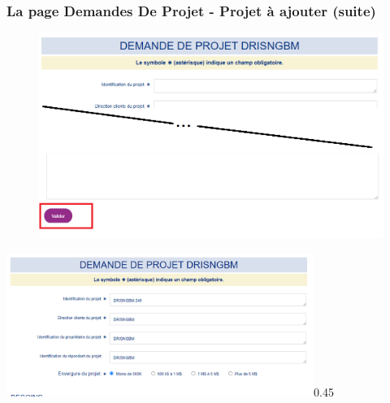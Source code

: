 \documentclass[aspectratio=169]{beamer}%
\let\note\relax
\begin{document}
\begin{frame}
\transwipe 
\label{pictures}
\frametitle{La page Demandes De Projet - Projet à ajouter (suite)}

\begin{figure}
\includegraphics[scale=0.33]{form_valider}
\end{figure}
\end{frame}
\begin{frame}
\transwipe 
  \centering
    \begin{annotate}{\includegraphics[width=0.75\textwidth]{Projet_a_soumettre}}{0.45}
        
    \end{annotate}
    
    \end{frame}
    
\end{document}
